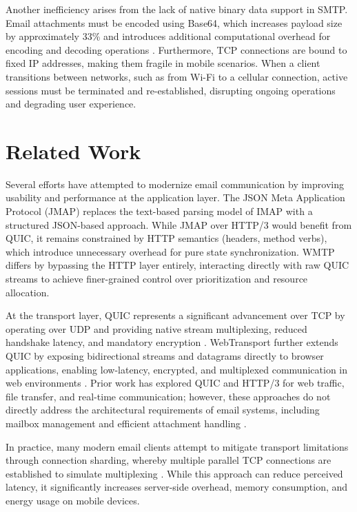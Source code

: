 \documentclass[10pt,a4paper]{article}
\begin{document}
Another inefficiency arises from the lack of native binary data support in SMTP. Email attachments must be encoded using Base64, which increases payload size by approximately 33\% and introduces additional computational overhead for encoding and decoding operations \cite{base64}. Furthermore, TCP connections are bound to fixed IP addresses, making them fragile in mobile scenarios. When a client transitions between networks, such as from Wi-Fi to a cellular connection, active sessions must be terminated and re-established, disrupting ongoing operations and degrading user experience.
\vspace{12pt}
\section{Related Work}

Several efforts have attempted to modernize email communication by improving usability and performance at the application layer. The JSON Meta Application Protocol (JMAP) \cite{jmap} replaces the text-based parsing model of IMAP with a structured JSON-based approach. While JMAP over HTTP/3 would benefit from QUIC, it remains constrained by HTTP semantics (headers, method verbs), which introduce unnecessary overhead for pure state synchronization. WMTP differs by bypassing the HTTP layer entirely, interacting directly with raw QUIC streams to achieve finer-grained control over prioritization and resource allocation.

At the transport layer, QUIC \cite{quic} represents a significant advancement over TCP by operating over UDP and providing native stream multiplexing, reduced handshake latency, and mandatory encryption \cite{tls13}. WebTransport \cite{webtransport} further extends QUIC by exposing bidirectional streams and datagrams directly to browser applications, enabling low-latency, encrypted, and multiplexed communication in web environments \cite{http3}. Prior work has explored QUIC and HTTP/3 for web traffic, file transfer, and real-time communication; however, these approaches do not directly address the architectural requirements of email systems, including mailbox management and efficient attachment handling \cite{smtp,imap,base64}.

In practice, many modern email clients attempt to mitigate transport limitations through connection sharding, whereby multiple parallel TCP connections are established to simulate multiplexing \cite{smtp}. While this approach can reduce perceived latency, it significantly increases server-side overhead, memory consumption, and energy usage on mobile devices.
\end{document}
